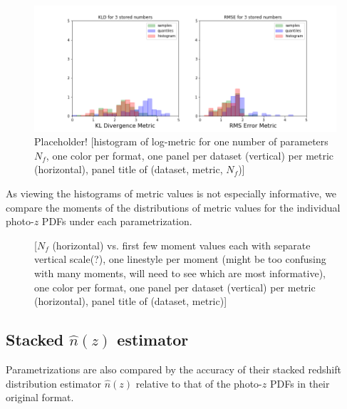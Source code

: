 \documentclass[\docopts]{\docclass}
\newcommand{\pz}{photo-$z$ PDF}
\begin{document}
\begin{figure}
  \includegraphics[width=0.9\columnwidth]{figures/individual_placeholder.png}
  \caption{Placeholder! [histogram of log-metric for one number of parameters 
$N_{f}$, one color per format, one panel per dataset (vertical) per metric 
(horizontal), panel title of (dataset, metric, $N_{f}$)]
  \label{fig:individual}}
\end{figure}

As viewing the histograms of metric values is not especially informative, we 
compare the moments of the distributions of metric values for the individual 
\pz s under each parametrization.

\begin{figure}
  \caption{ [$N_{f}$ (horizontal) vs. first few 
moment values each with separate vertical scale(?), one linestyle per moment 
(might be too confusing with many moments, will need to see which are most 
informative), one color per format, one panel per dataset (vertical) per metric 
(horizontal), panel title of (dataset, metric)]
  \label{fig:moments}}
\end{figure}


\subsection{Stacked $\hat{n}(z)$ estimator}
\label{sec:stacked}

Parametrizations are also compared by the accuracy of their stacked redshift 
distribution estimator $\hat{n}(z)$ relative to that of the \pz s in their 
original format.
\end{document}
